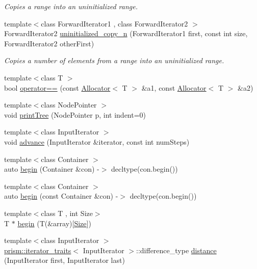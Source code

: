\begin{DoxyCompactItemize}
\begin{DoxyCompactList}\small\item\em Copies a range into an uninitialized range. \end{DoxyCompactList}\item 
{\footnotesize template$<$class Forward\+Iterator1 , class Forward\+Iterator2 $>$ }\\Forward\+Iterator2 \hyperlink{namespaceprism_ad1c7d8eb38174ba66d98321b68047e6e}{uninitialized\+\_\+copy\+\_\+n} (Forward\+Iterator1 first, const int size, Forward\+Iterator2 other\+First)
\begin{DoxyCompactList}\small\item\em Copies a number of elements from a range into an uninitialized range. \end{DoxyCompactList}\item 
{\footnotesize template$<$class T $>$ }\\bool \hyperlink{namespaceprism_a1faf99d35e2cbb2b8c0644aa0b777e9b}{operator==} (const \hyperlink{classprism_1_1_allocator}{Allocator}$<$ T $>$ \&a1, const \hyperlink{classprism_1_1_allocator}{Allocator}$<$ T $>$ \&a2)
\item 
{\footnotesize template$<$class Node\+Pointer $>$ }\\void \hyperlink{namespaceprism_a3ec96a679831176af1c6f2b7480226e1}{print\+Tree} (Node\+Pointer p, int indent=0)
\item 
{\footnotesize template$<$class Input\+Iterator $>$ }\\void \hyperlink{namespaceprism_a667eee76b54258f4f3530eaa7ef44d69}{advance} (Input\+Iterator \&iterator, const int num\+Steps)
\item 
{\footnotesize template$<$class Container $>$ }\\auto \hyperlink{namespaceprism_a6d7a987672303bcc2aad6eedfa3c97c5}{begin} (Container \&con) -\/$>$ decltype(con.\+begin())
\item 
{\footnotesize template$<$class Container $>$ }\\auto \hyperlink{namespaceprism_a1d797e0ebd535413f23ff6c378bce541}{begin} (const Container \&con) -\/$>$ decltype(con.\+begin())
\item 
{\footnotesize template$<$class T , int Size$>$ }\\T $\ast$ \hyperlink{namespaceprism_a1fa3ae5087a69ca4b87cd0142dd7f4f4}{begin} (T(\&array)\mbox{[}\hyperlink{classprism_1_1_size}{Size}\mbox{]})
\item 
{\footnotesize template$<$class Input\+Iterator $>$ }\\\hyperlink{structprism_1_1iterator__traits}{prism\+::iterator\+\_\+traits}$<$ Input\+Iterator $>$\+::difference\+\_\+type \hyperlink{namespaceprism_ad9a8b01383d77bc9bcd878901af6f8bb}{distance} (Input\+Iterator first, Input\+Iterator last)

\end{DoxyCompactItemize}
